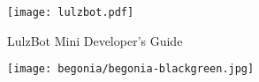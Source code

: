 %
%
%
%
%

\date {}
\thispagestyle{empty}
\begin{center}
\par
\texttt{[image: lulzbot.pdf]}

{\fontsize{25pt}{5cm}\selectfont \textcolor{ao-purple}{LulzBot Mini Developer's Guide}}

\texttt{[image: begonia/begonia-blackgreen.jpg]}

\end{center}
